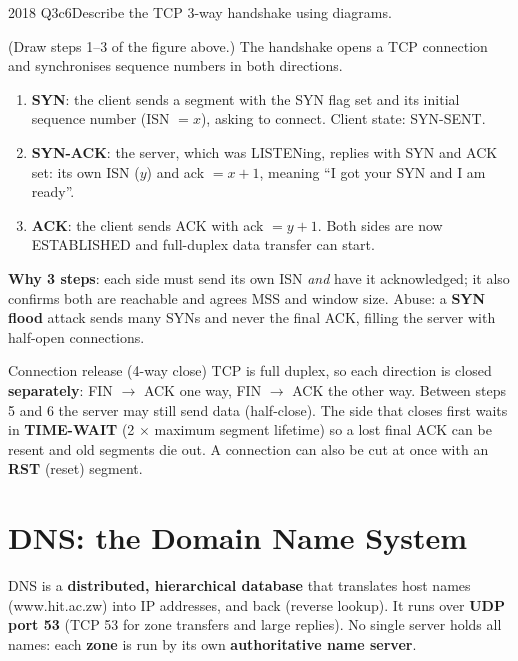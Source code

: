 \documentclass[10pt]{article}
\begin{document}
\begin{pastq}{2018 Q3c}{6}Describe the TCP 3-way handshake using diagrams.\end{pastq}
\begin{ans}
(Draw steps 1--3 of the figure above.) The handshake opens a TCP connection and synchronises sequence numbers in both directions.
\begin{enumerate}
\item \textbf{SYN}: the client sends a segment with the SYN flag set and its initial sequence number (ISN $= x$), asking to connect. Client state: SYN-SENT.
\item \textbf{SYN-ACK}: the server, which was LISTENing, replies with SYN and ACK set: its own ISN ($y$) and ack $= x + 1$, meaning ``I got your SYN and I am ready''.
\item \textbf{ACK}: the client sends ACK with ack $= y + 1$. Both sides are now ESTABLISHED and full-duplex data transfer can start.
\end{enumerate}
\textbf{Why 3 steps}: each side must send its own ISN \emph{and} have it acknowledged; it also confirms both are reachable and agrees MSS and window size. Abuse: a \textbf{SYN flood} attack sends many SYNs and never the final ACK, filling the server with half-open connections.
\end{ans}

\begin{keydef}{Connection release (4-way close)}
TCP is full duplex, so each direction is closed \textbf{separately}: FIN $\to$ ACK one way, FIN $\to$ ACK the other way. Between steps 5 and 6 the server may still send data (half-close).
The side that closes first waits in \textbf{TIME-WAIT} (2 $\times$ maximum segment lifetime) so a lost final ACK can be resent and old segments die out.
A connection can also be cut at once with an \textbf{RST} (reset) segment.
\end{keydef}

\section{DNS: the Domain Name System}

DNS is a \textbf{distributed, hierarchical database} that translates host names (www.hit.ac.zw) into IP addresses, and back (reverse lookup).
It runs over \textbf{UDP port 53} (TCP 53 for zone transfers and large replies).
No single server holds all names: each \textbf{zone} is run by its own \textbf{authoritative name server}.
\end{document}
